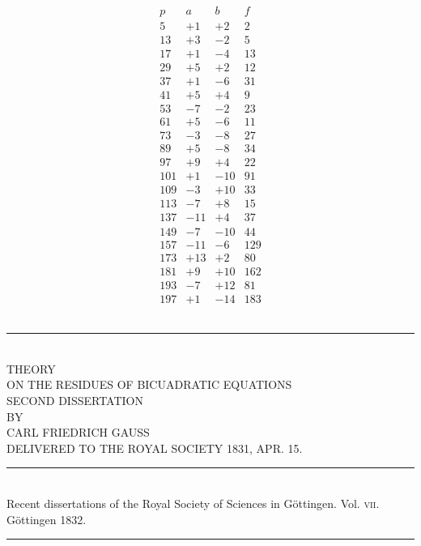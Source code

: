 \documentclass[twoside,12pt, showframe]{memoir}
\begin{document}
\[
\begin{array}{r|r|r|r}
p & a & b & f \\
\hline
5 & +1 & +2 & 2 \\
13 & +3 & -2 & 5 \\
17 & +1& -4 & 13 \\
29 & +5 & +2 & 12 \\
37 & +1 & -6 & 31 \\
41 & +5 & +4 & 9 \\
53 & -7 & -2 & 23 \\
61 & +5 & -6 & 11 \\
73 & -3 & -8 & 27 \\
89 & +5 & -8 & 34 \\
97 & +9 & +4 & 22 \\
101 & +1 & -10 & 91 \\
109 & -3 & +10 & 33 \\
113 & -7 & +8 & 15 \\
137 & -11 & +4 & 37 \\
149 & -7 & -10 & 44 \\
157 & -11 & -6 & 129 \\
173 & +13 & +2 & 80 \\
181 & +9 & +10 & 162 \\
193 & -7 & +12 & 81 \\
197 & +1 & -14 & 183 
\end{array}
\]\\[\baselineskip]
\begin{center} 
\rule{2in}{0.5pt}
\end{center}\clearpage

%

\begin{center}
\;\\[4\baselineskip]
{\large THEORY}\\[\baselineskip]
{\LARGE ON THE RESIDUES OF BICUADRATIC EQUATIONS}\\[3\baselineskip]
{\large SECOND DISSERTATION}\\[2.5\baselineskip]
{\tiny BY}\\[1.5\baselineskip]
CARL FRIEDRICH GAUSS\\[1.5\baselineskip]
{\scriptsize DELIVERED TO THE ROYAL SOCIETY {\tiny \textsc{1831},} APR. {\tiny \textsc{15}.}}\\[4\baselineskip]
\rule{4in}{0.5pt}\\[0.5\baselineskip]
{\small Recent dissertations of the Royal Society of Sciences in Göttingen. Vol. \textsc{vii}.\\
Göttingen \textsc{1832}.}\\
\rule{4in}{0.5pt}
\end{center}
\clearpage\noindent%
\;
\clearpage\noindent%
\end{document}
